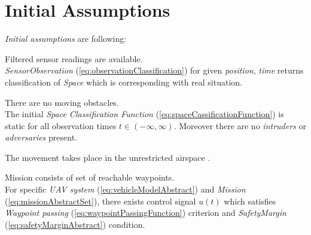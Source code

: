 \section{Initial Assumptions} \label{s:initialAssumptions}
    \noindent\emph{Initial assumptions} are following:

    \begin{assumption}
        {Filtered sensor readings are available}\label{ass:filteredSensors}.\\
        \emph{SensorObservation} (\ref{eq:observationClassification}) for given \emph{position}, \emph{time} returns classification of \emph{Space} which is corresponding with real situation.
    \end{assumption}
    
    \begin{assumption}
        {There are no moving obstacles}\label{ass:noMovingObstacles}.\\
        The initial \emph{Space Classification Function} (\ref{eq:spaceCassificationFunction}) is static for all observation times $t \in (-\infty,\infty)$. Moreover there are no \emph{intruders} or \emph{adversaries} present. 
    \end{assumption}

    \begin{assumption}
        {The movement takes place in the unrestricted airspace }\label{ass:openAir}.
    \end{assumption}

    \begin{assumption}
        {Mission consists of set of reachable waypoints}\label{ass:reachableWaypoints}.\\
        For specific \emph{UAV system} (\ref{eq:vehicleModelAbstract}) and  \emph{Mission} (\ref{eq:missionAbstractSet}), there exists control signal $u(t)$ which satisfies \emph{Waypoint passing} (\ref{eq:waypointPassingFunction}) criterion and \emph{SafetyMargin} (\ref{eq:safetyMarginAbstract}) condition.
    \end{assumption}
    
